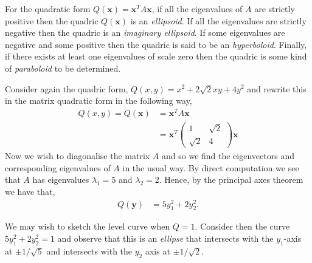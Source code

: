 \begin{lem}
 For the quadratic form $Q(\mathbf{x}) = \mathbf{x}^{T} A \mathbf{x}$, if
 all the eigenvalues of $A$ are strictly positive then the quadric $Q(\mathbf{x})$
 is an \emph{ellipsoid}. If all the eigenvalues are strictly negative then the quadric
 is an \emph{imaginary ellipsoid}. If some eigenvalues are negative and some positive
 then the quadric is said to be an \emph{hyperboloid}. Finally, if there exists at least
 one eigenvalues of scale zero then the quadric is some kind of \emph{paraboloid} to be
 determined.
\end{lem}

\begin{exmp}
 Consider again the quadric form, $Q(x,y) = x^2 + 2 \sqrt{2} xy + 4y^2$ and rewrite this
 in the matrix quadratic form in the following way,
 \begin{align*}
  Q(x,y) = Q(\mathbf{x}) &= \mathbf{x}^{T} A \mathbf{x}
  \\
  &= \mathbf{x}^{T}
  \begin{pmatrix}
   1 & \sqrt{2} \\
   \sqrt{2} & 4
  \end{pmatrix}
  \mathbf{x} \tag{division by two much like completing the square.}
  \end{align*}
  Now we wish to diagonalise the matrix $A$ and so we find the eigenvectors
  and corresponding eigenvalues of $A$ in the usual way. By direct computation
  we see that $A$ has eigenvalues $\lambda_1 = 5$ and $\lambda_2 = 2$. Hence,
  by the principal axes theorem we have that,
  \begin{align*}
   Q(\mathbf{y}) &= 5 y_1^{2} + 2 y_2^{2}.
  \end{align*}

  We may wish to sketch the level curve when $Q=1$.
  Consider then the curve $5 y_1^{2} + 2 y_2^{2} = 1$ and observe that this
  is an \emph{ellipse} that intersects with the $y_1$-axis at $\pm 1/\sqrt{5}$
  and intersects with the $y_2$ axis at $\pm 1/\sqrt{2}$.


\end{exmp}
